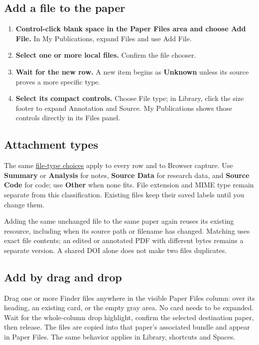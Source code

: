 \documentclass[10pt,letterpaper,oneside]{scrreprt}
\providecommand{\tightlist}{\setlength{\itemsep}{1pt}\setlength{\parskip}{0pt}}
\begin{document}
\subsection{Add a file to the paper}\label{add-a-file-to-the-paper}

\begin{enumerate}
\tightlist
\item
  \textbf{Control-click blank space in the Paper Files area and choose \textbf{Add File}.} In My Publications, expand Files and use Add File.
\item
  \textbf{Select one or more local files.} Confirm the file chooser.
\item
  \textbf{Wait for the new row.} A new item begins as \textbf{Unknown} unless its source proves a more specific type.
\item
  \textbf{Select its compact controls.} Choose File type; in Library, click the size footer to expand Annotation and Source. My Publications shows those controls directly in its Files panel.
\end{enumerate}

\subsection{Attachment types}\label{attachment-types}

The same \hyperref[versions-current]{file-type choices} apply to every row and to Browser capture. Use \textbf{Summary} or \textbf{Analysis} for notes, \textbf{Source Data} for research data, and \textbf{Source Code} for code; use \textbf{Other} when none fits. File extension and MIME type remain separate from this classification. Existing files keep their saved labels until you change them.

Adding the same unchanged file to the same paper again reuses its existing resource, including when its source path or filename has changed. Matching uses exact file contents; an edited or annotated PDF with different bytes remains a separate version. A shared DOI alone does not make two files duplicates.

\subsection{Add by drag and drop}\label{add-by-drag-and-drop}

Drag one or more Finder files anywhere in the visible Paper Files column: over its heading, an existing card, or the empty gray area. No card needs to be expanded. Wait for the whole-column drop highlight, confirm the selected destination paper, then release. The files are copied into that paper's associated bundle and appear in Paper Files. The same behavior applies in Library, shortcuts and Spaces.
\end{document}
